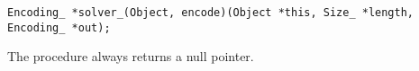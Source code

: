 
\tt{Encoding_ *solver_(Object, encode)(Object *this, Size_ *length, Encoding_ *out);}


The procedure always returns a null pointer.
